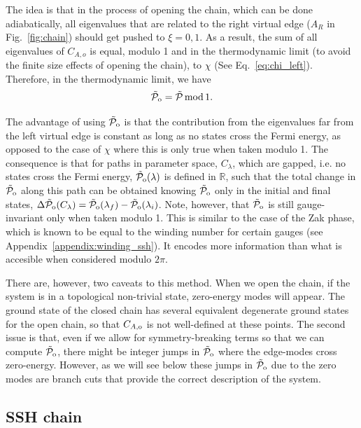 \documentclass[twocolumn,amsmath,longbibliography,amssymb,superscriptaddress]{revtex4-1}
\newcommand{\tpo}{\tilde{\mathcal{P}}_{\rm o}}
\begin{document}
The idea is that in the process of opening the chain, which can be done adiabatically, all eigenvalues that are related to the right virtual edge ($A_R$ in Fig.~\ref{fig:chain}) should get pushed to $\xi=0,1$. As a result, the sum of all eigenvalues of $C_{A,o}$ is equal, modulo 1 and in the thermodynamic limit (to avoid the finite size effects of opening the chain), to $\chi$ (See Eq.~\eqref{eq:chi_left}). Therefore, in the thermodynamic limit, we have
\begin{equation}
\tpo = \tilde{\mathcal{P}} \, {\rm mod} \, 1.
\end{equation}


The advantage of using $\tpo$ is that the contribution from the eigenvalues far from the left virtual edge is constant as long as no states cross the Fermi energy, as opposed to the case of $\chi$ where this is only true when taken modulo 1. The consequence is that for paths in parameter space, $C_\lambda$, which are gapped, i.e. no states cross the Fermi energy, $\tpo (\lambda)$ is defined in $\mathbb{R}$, such that the total change in $\tpo$ along this path can be obtained knowing $\tpo$ only in the initial and final states, $\Delta \tpo ({C_\lambda}) = \tpo(\lambda_f) - \tpo(\lambda_i)$. Note, however, that $\tpo$ is still gauge-invariant only when taken modulo 1. This is similar to the case of the Zak phase, which is known to be equal to the winding number for certain gauges (see Appendix~\ref{appendix:winding_ssh}). It encodes more information than what is accesible when considered modulo $2\pi$.

There are, however, two caveats to this method. When we open the chain, if the system is in a topological non-trivial state, zero-energy modes will appear. The ground state of the closed chain has several equivalent degenerate ground states for the open chain, so that $C_{A,\rm o}$ is not well-defined at these points. The second issue is that, even if we allow for symmetry-breaking terms so that we can compute $\tpo$, there might be integer jumps in $\tpo$ where the edge-modes cross zero-energy. However, as we will see below these jumps in $\tpo$ due to the zero modes are branch cuts that provide the correct description of the system. 


\subsection{SSH chain}
\end{document}
